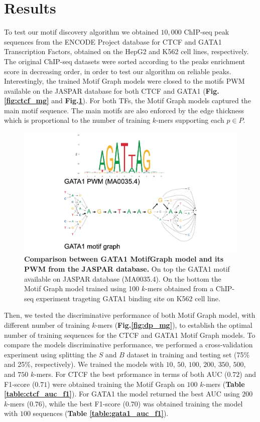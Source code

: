 \documentclass[a4paper, titlepage, 8pt, openright]{book}
\begin{document}
\section{Results}
To test our motif discovery algorithm we obtained $10,000$ ChIP-seq peak sequences from the ENCODE Project database \citep{encode2012integrated} for CTCF and GATA1 Transcription Factors, obtained on the HepG2 and K562 cell lines, respectively. The original ChIP-seq datasets were sorted according to the peaks enrichment score in decreasing order, in order to test our algorithm on reliable peaks. Interestingly, the trained Motif Graph models were closed to the motifs PWM available on the JASPAR database \citep{sandelin2004jaspar} for both CTCF and GATA1 (\textbf{Fig.\ref{fig:ctcf_mg}} and \textbf{Fig.\ref{fig:gata1_mg}}). For both TFs, the Motif Graph models captured the main motif sequence. The main motifs are also enforced by the edge thickness which is proportional to the number of training $k$-mers supporting each $p \in P$.
\begin{figure}
	\centering
	\includegraphics[width=\textwidth]{figures/gata1_mg.jpg}
	\caption[Comparison between GATA1 Motif Graph model and its PWM from the JASPAR database.]{\textbf{Comparison between GATA1 MotifGraph model and its PWM from the JASPAR database.} On top the GATA1 motif available on JASPAR database (MA0035.4). On the bottom the Motif Graph model trained using 100 $k$-mers obtained from a ChIP-seq experiment trageting GATA1 binding site on K562 cell line.}
	\label{fig:gata1_mg}
\end{figure} 
Then, we tested the discriminative performance of both Motif Graph model, with different number of training $k$-mers (\textbf{Fig.\ref{fig:dp_mg}}), to establish the optimal number of training sequences for the CTCF and GATA1 Motif Graph models. To compare the models discriminative performance, we performed a cross-validation experiment using splitting the $S$ and $B$ dataset in training and testing set (75\% and 25\%, respectively). We trained the models with $10$, $50$, $100$, $200$, $350$, $500$, and $750$ $k$-mers. For CTCF the best prformance in terms of both AUC ($0.72$) and F1-score ($0.71$) were obtained training the Motif Graph on $100$ $k$-mers (\textbf{Table \ref{table:ctcf_auc_f1}}). For GATA1 the model returned the best AUC using $200$ $k$-mers ($0.76$), while the best F1-score ($0.70$) was obtained training the model with $100$ sequences (\textbf{Table \ref{table:gata1_auc_f1}}).
\end{document}
